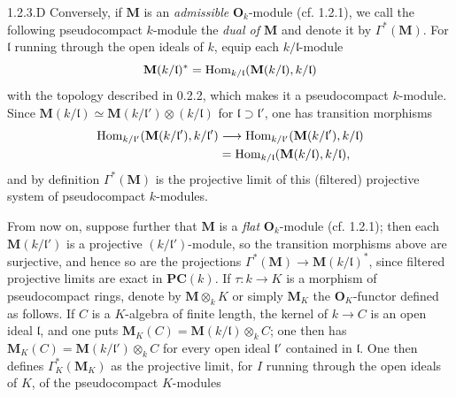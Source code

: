 \begin{definition}{1.2.3.D}\label{VIIB.1.2.3.D}
Conversely, if $\mathbf M$ is an \emph{admissible} $\mathbf O_k$-module (cf. 1.2.1), we call the following pseudocompact $k$-module the \emph{dual of $\mathbf M$} and denote it by $\Gamma^*(\mathbf M)$. For $\mathfrak l$ running through the open ideals of $k$, equip each $k/\mathfrak l$-module
\[
\mathbf M(k/\mathfrak l)^*=\operatorname{Hom}_{k/\mathfrak l}(\mathbf M(k/\mathfrak l),k/\mathfrak l)
\]
with the topology described in 0.2.2, which makes it a pseudocompact $k$-module. Since $\mathbf M(k/\mathfrak l)\simeq\mathbf M(k/\mathfrak l')\otimes(k/\mathfrak l)$ for $\mathfrak l\supset\mathfrak l'$, one has transition morphisms
\[
\begin{aligned}
\operatorname{Hom}_{k/\mathfrak l'}(\mathbf M(k/\mathfrak l'),k/\mathfrak l')&\longrightarrow\operatorname{Hom}_{k/\mathfrak l'}(\mathbf M(k/\mathfrak l'),k/\mathfrak l)\\
&=\operatorname{Hom}_{k/\mathfrak l}(\mathbf M(k/\mathfrak l),k/\mathfrak l),
\end{aligned}
\]
and by definition $\Gamma^*(\mathbf M)$ is the projective limit of this (filtered) projective system of pseudocompact $k$-modules.
\end{definition}
From now on, suppose further that $\mathbf M$ is a \emph{flat} $\mathbf O_k$-module (cf. 1.2.1); then each $\mathbf M(k/\mathfrak l')$ is a projective $(k/\mathfrak l')$-module, so the transition morphisms above are surjective, and hence so are the projections $\Gamma^*(\mathbf M)\to\mathbf M(k/\mathfrak l)^*$, since filtered projective limits are exact in $\mathbf{PC}(k)$.
If $\tau:k\to K$ is a morphism of pseudocompact rings, denote by $\mathbf M\otimes_k K$ or simply $\mathbf M_K$ the $\mathbf O_K$-functor defined as follows. If $C$ is a $K$-algebra of finite length, the kernel of $k\to C$ is an open ideal $\mathfrak l$, and one puts $\mathbf M_K(C)=\mathbf M(k/\mathfrak l)\otimes_k C$; one then has $\mathbf M_K(C)=\mathbf M(k/\mathfrak l')\otimes_k C$ for every open ideal $\mathfrak l'$ contained in $\mathfrak l$. One then defines $\Gamma_K^*(\mathbf M_K)$ as the projective limit, for $I$ running through the open ideals of $K$, of the pseudocompact $K$-modules
